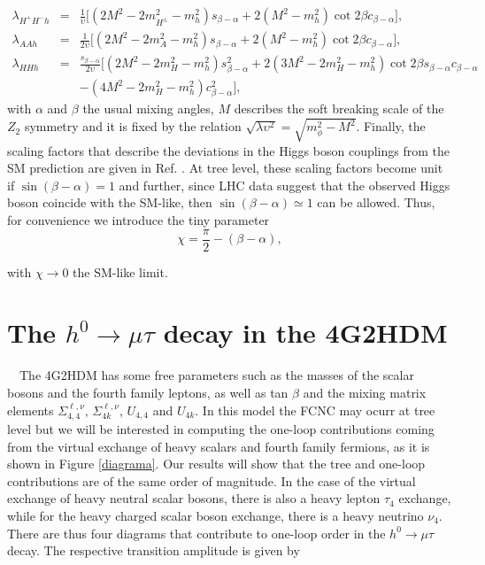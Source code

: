 \documentclass[a4paper]{jpconf}
\begin{document}
\begin{eqnarray}
\lambda_{H^+H^-h}&=&\frac{1}{\upsilon}\Big[(2M^2-2m_{H^\pm}^2-m_h^2)s_{\beta-\alpha}+2(M^2-m_h^2)\cot2\beta c_{\beta-\alpha}\Big],\label{HHpmh}\\
\lambda_{AAh}&=& \frac{1}{2\upsilon}\Big[(2M^2-2m_A^2-m_h^2)s_{\beta-\alpha}+2(M^2-m_h^2)\cot2\beta c_{\beta-\alpha}\Big],\label{AAh}\\
\lambda_{HHh}&=& \frac{s_{\beta-\alpha}}{2\upsilon}\Big[(2M^2-2m_H^2-m_h^2)s_{\beta-\alpha}^2+2(3M^2-2m_H^2-m_h^2)\cot2\beta s_{\beta-\alpha}c_{\beta-\alpha}\nonumber\\
&{}&-(4M^2-2m_H^2-m_h^2)c_{\beta-\alpha}^2\Big]\label{HHh},
\label{triple-scalar-couplings}
\end{eqnarray}
with $\alpha$ and $\beta$ the usual mixing angles, $M$ describes the soft breaking scale of the $Z_2$ symmetry and it is fixed by the relation $\sqrt{\lambda \upsilon^{2}}=\sqrt{m_{\phi}^{2}-M^{2}}$. Finally, the scaling factors that describe the deviations in the Higgs boson couplings from the SM prediction are given in Ref. \cite{Kanemura:2015mxa}. At tree level, these scaling factors become unit if $\sin(\beta-\alpha)=1$ and further, since LHC data suggest that the observed Higgs boson coincide with the SM-like, then $\sin(\beta-\alpha)\simeq 1$ can be allowed. Thus, for convenience we introduce the tiny parameter 
\begin{equation}
\chi=\frac{\pi}{2}-(\beta-\alpha),
\label{chi}
\end{equation}

with $\chi\to 0$ the SM-like limit.

\section{The $h^0 \to \mu \tau$ decay in the 4G2HDM}
\ \
The 4G2HDM has some free parameters such as the masses of the scalar bosons and the fourth family leptons, as well as tan $ \beta $ and the mixing matrix elements $\Sigma_{4,4}^{\ell,\nu}$, $\Sigma_{4k}^{\ell,\nu}$, $U_{4,4}$ and $U_{4k}$.  In this model the FCNC may ocurr at tree level but we will be interested in computing the one-loop contributions coming from the virtual exchange of heavy scalars and fourth family fermions, as it is shown in Figure \ref{diagrama}. Our results will show that the tree and one-loop contributions are of the same order of magnitude. In the case of the virtual exchange of heavy neutral scalar bosons, there is also a heavy lepton $ \tau_{4} $ exchange, while for the heavy charged scalar boson exchange, there is a heavy neutrino $ \nu_{4} $. There are thus four diagrams that contribute to one-loop order in the $h^0 \to \mu \tau$ decay. The respective transition amplitude is given by
\end{document}
